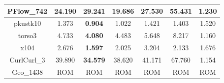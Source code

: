 \begin{table}[h!]
\begin{tabular}{|c|c|c|c|c|c|c|}
\\ \hline
PFlow\_742                                            & 24.190                                                    & 29.241                                                     & \textbf{19.686}                                           & 27.530                                                     & 55.431                                                     & 1.230                                                           \\ \hline
pkustk10                                              & 1.373                                                     & \textbf{0.904}                                             & 1.022                                                     & 1.421                                                      & 1.403                                                      & 1.520                                                           \\ \hline
torso3                                                & 4.733                                                     & \textbf{4.080}                                             & 4.483                                                     & 5.648                                                      & 8.217                                                      & 1.160                                                           \\ \hline
x104                                                  & 2.676                                                     & \textbf{1.597}                                             & 2.025                                                     & 3.204                                                      & 2.133                                                      & 1.676                                                           \\ \hline
CurlCurl\_3                                           & 39.890                                                    & \textbf{34.579}                                            & 38.620                                                    & 41.171                                                     & 67.760                                                     & 1.154                                                           \\ \hline
Geo\_1438                                             & ROM                                                       & ROM                                                        & ROM                                                       & ROM                                                        & ROM                                                        & ROM                                                             \\ \hline

\end{tabular}
\end{table}
